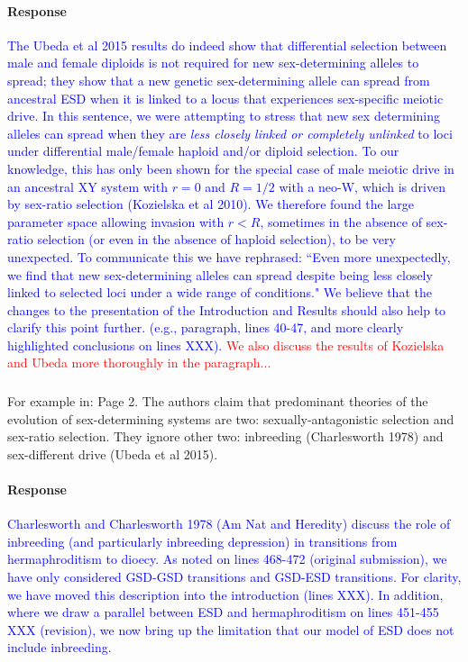 \documentclass[10pt,letterpaper]{article}
\begin{document}
\noindent\paragraph{Response}
\textcolor{blue}{The Ubeda et al 2015 results do indeed show that differential selection between male and female diploids is not required for new sex-determining alleles to spread; they show that a new genetic sex-determining allele can spread from ancestral ESD when it is linked to a locus that experiences sex-specific meiotic drive. 
In this sentence, we were attempting to stress that new sex determining alleles can spread when they are \textit{less closely linked or completely unlinked} to loci under differential male/female haploid and/or diploid selection. 
To our knowledge, this has only been shown for the special case of male meiotic drive in an ancestral XY system with $r=0$ and $R=1/2$ with a neo-W, which is driven by sex-ratio selection (Kozielska et al 2010). 
We therefore found the large parameter space allowing invasion with $r<R$, sometimes in the absence of sex-ratio selection (or even in the absence of haploid selection), to be very unexpected.
}
\textcolor{blue}{To communicate this we have rephrased: ``Even more unexpectedly, we find that new sex-determining alleles can spread despite being less closely linked to selected loci under a wide range of conditions." 
We believe that the changes to the presentation of the Introduction and Results should also help to clarify this point further. (e.g., paragraph, lines 40-47, and more clearly highlighted conclusions on lines XXX).  }
\textcolor{red}{We also discuss the results of Kozielska and Ubeda more thoroughly in the paragraph...}

\noindent\subsubsection{}
For example in: Page 2. The authors claim that predominant theories of the evolution of sex-determining systems are two: sexually-antagonistic selection and sex-ratio selection. They ignore other two: inbreeding (Charlesworth 1978) and sex-different drive (Ubeda et al 2015). 

\noindent\paragraph{Response}
\textcolor{blue}{
Charlesworth and Charlesworth 1978 (Am Nat and Heredity) discuss the role of inbreeding (and particularly inbreeding depression) in transitions from hermaphroditism to dioecy. 
As noted on lines 468-472 (original submission), we have only considered GSD-GSD transitions and GSD-ESD transitions.
For clarity, we have moved this description into the introduction (lines XXX). 
In addition, where we draw a parallel between ESD and hermaphroditism on lines 451-455 XXX (revision), we now bring up the limitation that our model of ESD does not include inbreeding. }
\end{document}
